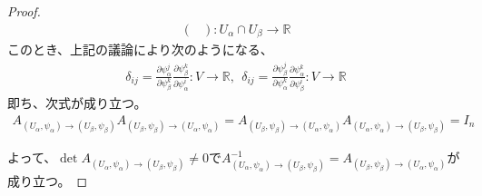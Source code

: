 \documentclass[dvipdfmx]{jsarticle}
\begin{document}
\begin{proof}
\begin{align*}
\begin{pmatrix}
  \end{pmatrix} : U_\alpha \cap U_\beta \rightarrow \mathbb{R}
\end{align*}
このとき、上記の議論により次のようになる、
\begin{align*}
  \delta_{ij} = \frac{\partial \psi_\alpha^j }{\partial \psi_\beta^k } \frac{\partial \psi_\beta^k }{\partial \psi_\alpha^i } : V\rightarrow \mathbb{R},\ \ \delta_{ij} = \frac{\partial \psi_\beta^j }{\partial \psi_\alpha^k } \frac{\partial \psi_\alpha^k }{\partial \psi_\beta^i } : V\rightarrow \mathbb{R}
\end{align*}
即ち、次式が成り立つ。
\begin{align*}
  A_{\left(U_\alpha ,\psi_\alpha \right)\rightarrow \left(U_\beta ,\psi_\beta \right)} A_{\left(U_\beta ,\psi_\beta \right)\rightarrow \left(U_\alpha ,\psi_\alpha \right)} =A_{\left(U_\beta ,\psi_\beta \right)\rightarrow \left(U_\alpha ,\psi_\alpha \right)} A_{\left(U_\alpha ,\psi_\alpha \right)\rightarrow \left(U_\beta ,\psi_\beta \right)} =I_n 
\end{align*}\par
よって、$\det A_{\left(U_\alpha ,\psi_\alpha \right)\rightarrow \left(U_\beta ,\psi_\beta \right)} \ne 0$で$A_{\left(U_\alpha ,\psi_\alpha \right)\rightarrow \left(U_\beta ,\psi_\beta \right)}^{-1} = A_{\left(U_\beta ,\psi_\beta \right)\rightarrow \left(U_\alpha ,\psi_\alpha \right)} $が成り立つ。
\begin{comment}
$\det A_{\left(U_\alpha ,\psi_\alpha \right)\rightarrow \left(U_\beta ,\psi_\beta \right)} = 0$が成り立つと仮定すると、上記の議論より次のようになる。
\begin{align*}
  1 &= \det I_n =\det \begin{pmatrix}
    1 & 0 & \cdots & 0 \\
    0 & 1 & \cdots & 0 \\
    \vdots & \vdots & \ddots & \vdots \\
    0 & 0 & \cdots & 1 \\
  \end{pmatrix}\\
  &= \left| \begin{matrix}
    \frac{\partial \psi_\alpha^1 }{\partial \psi_\beta^k } \frac{\partial \psi_\beta^k }{\partial \psi_\alpha^1 } & \frac{\partial \psi_\alpha^2 }{\partial \psi_\beta^k } \frac{\partial \psi_\beta^k }{\partial \psi_\alpha^1 } & \cdots & \frac{\partial \psi_\alpha^n }{\partial \psi_\beta^k } \frac{\partial \psi_\beta^k }{\partial \psi_\alpha^1 }\\

\end{comment}
\end{proof}
\end{document}
